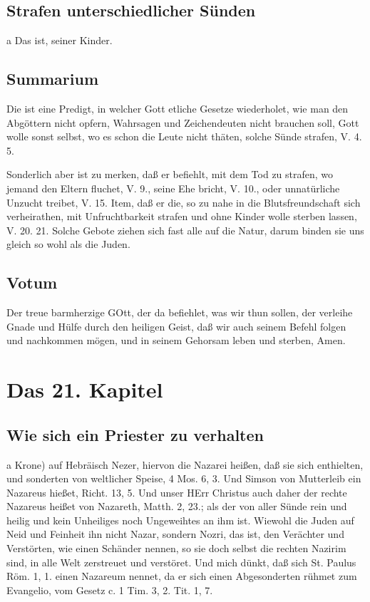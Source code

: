 \section{Strafen unterschiedlicher Sünden}

a Das ist, seiner Kinder.

\section{Summarium}

Die ist eine Predigt, in welcher Gott etliche Gesetze wiederholet, wie man den Abgöttern nicht opfern, Wahrsagen und Zeichendeuten nicht brauchen soll, Gott wolle sonst selbst, wo es schon die Leute nicht thäten, solche Sünde strafen, V. 4. 5.

Sonderlich aber ist zu merken, daß er befiehlt, mit dem Tod zu strafen, wo jemand den Eltern fluchet, V. 9., seine Ehe bricht, V. 10., oder unnatürliche Unzucht treibet, V. 15. Item, daß er die, so zu nahe in die Blutsfreundschaft sich verheirathen, mit Unfruchtbarkeit strafen und ohne Kinder wolle sterben lassen, V. 20. 21. Solche Gebote ziehen sich fast alle auf die Natur, darum binden sie uns gleich so wohl als die Juden.

\section{Votum}

Der treue barmherzige GOtt, der da befiehlet, was wir thun sollen, der verleihe Gnade und Hülfe durch den heiligen Geist, daß wir auch seinem Befehl folgen und nachkommen mögen, und in seinem Gehorsam leben und sterben, Amen.

\chapter{Das 21. Kapitel}

\section{Wie sich ein Priester zu verhalten}

a Krone) auf Hebräisch Nezer, hiervon die Nazarei heißen, daß sie sich enthielten, und sonderten von weltlicher Speise, 4 Mos. 6, 3. Und Simson von Mutterleib ein Nazareus hießet, Richt. 13, 5. Und unser HErr Christus auch daher der rechte Nazareus heißet von Nazareth, Matth. 2, 23.; als der von aller Sünde rein und heilig und kein Unheiliges noch Ungeweihtes an ihm ist. Wiewohl die Juden auf Neid und Feinheit ihn nicht Nazar, sondern Nozri, das ist, den Verächter und Verstörten, wie einen Schänder nennen, so sie doch selbst die rechten Nazirim sind, in alle Welt zerstreuet und verstöret. Und mich dünkt, daß sich St. Paulus Röm. 1, 1. einen Nazareum nennet, da er sich einen Abgesonderten rühmet zum Evangelio, vom Gesetz c. 1 Tim. 3, 2. Tit. 1, 7.

